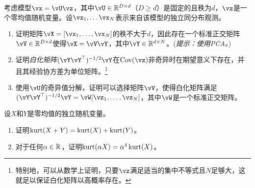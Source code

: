\documentclass[../../book-main.tex]{subfiles}
\begin{document}
\begin{exercise}\label{exercise:whitening}
    考虑模型$\vx = \vU \vz$，其中$\vU \in \R^{D \times d}$（$D \geq d$）是固定的且秩为$d$，$\vz$是一个零均值随机变量。设$\vx_1, \dots \vx_N$表示来自该模型的独立同分布观测。
    \begin{enumerate}
        \item 证明矩阵$\vX = [\vx_1, \dots, \vx_N]$的秩不大于$d$，因此存在一个标准正交矩阵$\vV \in \R^{D \times d}$使得$\vX = \vV \vY$，其中$\vY \in \R^{d \times N}$。(\textit{提示：使用PCA。})
        \item 证明\textit{白化矩阵}$(\vY \vY^\top)^{-1/2}\vY$在$\Cov(\vz)$非奇异时在期望意义下存在，并且其经验协方差为单位矩阵。\footnote{特别地，可以从数学上证明，只要$\vz$满足适当的集中不等式且$N$足够大，这就足以保证白化矩阵以高概率存在。}
        \item 使用$\vU$的奇异值分解，证明可以选择矩阵$\vV$，使得白化矩阵满足$(\vY \vY^\top)^{-1/2} \vY = \vW [\vz_1, \dots, \vz_N]$，其中$\vW$是一个标准正交矩阵。
    \end{enumerate}
\end{exercise}

\begin{exercise}\label{exercise:kurtosis-linearity-properties}
    设$X$和$Y$是零均值的独立随机变量。
    \begin{enumerate}
        \item 证明$\mathop{\mathrm{kurt}}(X + Y) = \mathop{\mathrm{kurt}}(X) + \mathop{\mathrm{kurt}}(Y)$。
        \item 对于任何$\alpha \in \mathbb{R}$，证明$\mathop{\mathrm{kurt}}(\alpha X) = \alpha^4 \mathop{\mathrm{kurt}}(X)$。
    \end{enumerate}
\end{exercise}
\end{document}
